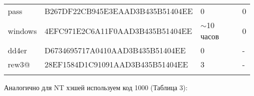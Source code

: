 \begin{table}[]
\begin{tabular}{llll}
    pass          & B267DF22CB945E3EAAD3B435B51404EE & 0              & 0                \\
    windows       & 4EFC971E2C6A11F0AAD3B435B51404EE & $\sim$10 часов & 0                \\
    dd4er         & D6734695717A0410AAD3B435B51404EE & 0              & -                \\
    rew3@         & 28EF1584D1C91091AAD3B435B51404EE & 3              & -                \\
                  &                                  &                &                 
    \end{tabular}
\end{table}

Аналогично для NT хэшей используем код 1000 (Таблица 3):

